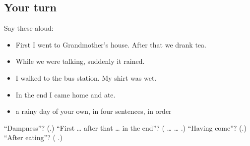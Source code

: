 \subsection*{Your turn}
Say these aloud:

\begin{itemize}
\raggedright
  \item First I went to Grandmother's house. After that we drank tea.
  \item While we were talking, suddenly it rained.
  \item I walked to the bus station. My shirt was wet.
  \item In the end I came home and ate.
  \item a rainy day of your own, in four sentences, in order
\end{itemize}

\begin{tcolorbox}[breakable,colback=teal!4,colframe=teal!35!black,title={Before you move on}]
\textquotedblleft{}Dampness\textquotedblright{}? (\textbf{}.) \textquotedblleft{}First … after that … in the end\textquotedblright{}? (\textbf{} … \textbf{ } … \textbf{}.) \textquotedblleft{}Having come\textquotedblright{}? (\textbf{}.) \textquotedblleft{}After eating\textquotedblright{}? (\textbf{ }.)
\end{tcolorbox}
